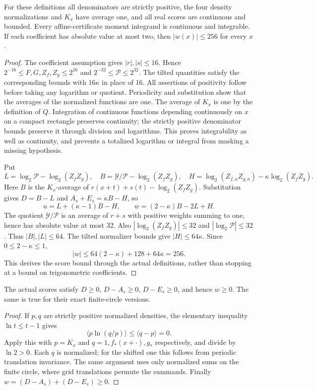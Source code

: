 \begin{lemma}\label{lem:exist}
For these definitions all denominators are strictly positive, the four
density normalizations and $K_x$ have average one, and all real scores
are continuous and bounded. Every affine-certificate moment integrand
is continuous and integrable. If each coefficient has absolute value
at most two, then $|w(x)|\le256$ for every $x$.
\end{lemma}
\begin{proof}
The coefficient assumption gives $|r|,|s|\le16$. Hence
$2^{-16}\le F,G,Z_f,Z_g\le2^{16}$ and
$2^{-32}\le\mathcal P\le2^{32}$. The tilted quantities satisfy the
corresponding bounds with $16\kappa$ in place of 16.
All assertions of positivity follow before taking any logarithm or
quotient. Periodicity and substitution show that the averages of the
normalized functions are one. The average of $K_x$ is one by the
definition of $Q$. Integration of continuous functions depending
continuously on $x$ on a compact rectangle preserves continuity;
the strictly positive denominator bounds preserve it through division
and logarithms. This proves integrability as well as continuity, and
prevents a totalized logarithm or integral from masking a missing hypothesis.

Put
\[
 L=\log_2\mathcal P-\log_2(Z_fZ_g),\quad
 B=\mathcal Y/\mathcal P-\log_2(Z_fZ_g),\quad
 H=\log_2(Z_{f,\kappa}Z_{g,\kappa})-\kappa\log_2(Z_fZ_g).
\]
Here $B$ is the $K_x$-average of $r(x+t)+s(t)-\log_2(Z_fZ_g)$.
Substitution gives $D=B-L$ and $A_s+E_s=\kappa B-H$, so
\begin{equation}\label{eq:score-identities}
 u=L+(\kappa-1)B-H,\qquad w=(2-\kappa)B-2L+H.
\end{equation}
The quotient $\mathcal Y/\mathcal P$ is an average of $r+s$ with
positive weights summing to one, hence has absolute value at most 32.
Also $|\log_2(Z_fZ_g)|\le32$ and $|\log_2\mathcal P|\le32$.
Thus $|B|,|L|\le64$. The tilted normalizer bounds give $|H|\le64\kappa$.
Since $0\le2-\kappa\le1$,
\[
 |w|\le64(2-\kappa)+128+64\kappa=256.
\]
This derives the score bound through the actual definitions, rather
than stopping at a bound on trigonometric coefficients.
\end{proof}

\begin{lemma}\label{lem:entropy-order}
The actual scores satisfy $D\ge0$, $D-A_s\ge0$, $D-E_s\ge0$,
and hence $w\ge0$. The same is true for their exact finite-circle
versions.
\end{lemma}
\begin{proof}
If $p,q$ are strictly positive normalized densities, the elementary
inequality $\ln t\le t-1$ gives
\[
 \langle p\ln(q/p)\rangle\le\langle q-p\rangle=0.
\]
Apply this with $p=K_x$ and $q=1,f_*(x+\cdot),g_*$ respectively,
and divide by $\ln2>0$. Each $q$ is normalized; for the shifted
one this follows from periodic translation invariance. The same
argument uses only normalized sums on the finite circle, where grid
translations permute the summands. Finally
$w=(D-A_s)+(D-E_s)\ge0$.
\end{proof}

